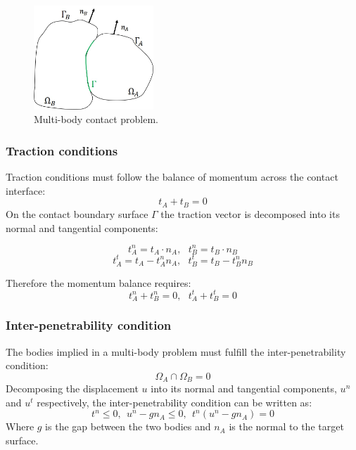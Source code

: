  \begin{center}
\begin{figure}
\centerline{\includegraphics[width=0.4\textwidth,keepaspectratio]{figures/contact_bodies.jpg} }
\caption{Multi-body contact problem.}
\label{contact_bodies}
\end{figure}
\end{center} 
   
  \subsubsection*{Traction conditions}
  Traction conditions must follow the balance of momentum across the contact interface:
  \begin{equation}
  t_A + t_B=0
\end{equation}
On the contact boundary surface $\Gamma$ the traction vector is decomposed into its normal and tangential components:

$$t_A^n = t_A \cdot n_A,  \ \ \ t_B^n = t_B \cdot n_B$$
$$t_A^t = t_A - t_A^n n_A, \ \ \ t_B^t = t_B - t_B^n n_B$$

Therefore the momentum balance requires:
\begin{equation} 
t_A^n + t_B^n = 0, \ \ \ t_A^t + t_B^t = 0
\end{equation} 

 \subsubsection*{Inter-penetrability condition}
The bodies implied in a multi-body problem must fulfill the inter-penetrability condition:
\begin{equation}
\Omega_A \cap \Omega_B = 0
\end{equation}
Decomposing the displacement $u$ into its normal and tangential components, $u^n$ and $u^t$ respectively, the inter-penetrability condition can be written as:
\begin{equation}
t^n \leq 0, \ \ u^n-g n_A \leq 0, \ \ t^n(u^n-g n_A) = 0
\end{equation}
 Where $g$ is the gap between the two bodies and $n_A$ is the normal to the target surface.

